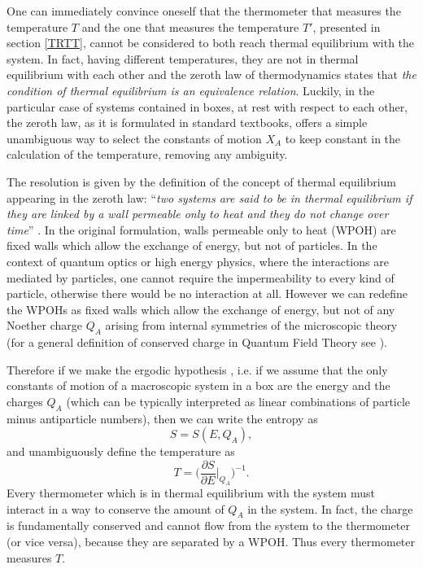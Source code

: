 \documentclass[twocolumn,usenatbib]{mnras2}
\begin{document}
%


One can immediately convince oneself that the thermometer that measures the temperature $T$ and the one that measures the temperature $T'$, presented in section \ref{TRTT}, cannot be considered to both reach thermal equilibrium with the system. In fact, having different temperatures, they are not in thermal equilibrium with each other and the zeroth law of thermodynamics states that \textit{the condition of thermal equilibrium is an equivalence relation}. Luckily, in the particular case of systems contained in boxes, at rest with respect to each other, the zeroth law, as it is formulated in standard textbooks, offers a simple unambiguous way to select the constants of motion $X_A$ to keep constant in the calculation of the temperature, removing any ambiguity. 

The resolution is given by the definition of the concept of thermal equilibrium appearing in the zeroth law: ``\textit{two systems are said to be in thermal equilibrium if they are linked by a wall permeable only to heat and they do not change over time}'' \citep{Caratheodory1909}. In the original formulation, walls permeable only to heat (WPOH) are fixed walls which allow the exchange of energy, but not of particles. In the context of quantum optics or high energy physics, where the interactions are mediated by particles, one cannot require the impermeability to every kind of particle, otherwise there would be no interaction at all. However we can redefine the WPOHs as fixed walls which allow the exchange of energy, but not of any Noether charge $Q_A$ arising from internal symmetries of the microscopic theory (for a general definition of conserved charge in Quantum Field Theory see \citealt{Peskin_book}).

Therefore if we make the ergodic hypothesis \citep{khinchin_book,Parisi_book_1988}, i.e. if we assume that the only constants of motion of a macroscopic system in a box are the energy and the charges $Q_A$ (which can be typically interpreted as linear combinations of particle minus antiparticle numbers), then we can write the entropy as
\begin{equation}\label{hththth}
S=S(E,Q_A),
\end{equation}
and unambiguously define the temperature as
\begin{equation}
T = \bigg( \dfrac{\partial S}{\partial E}\bigg|_{Q_A} \bigg)^{-1}.
\end{equation}
Every thermometer which is in thermal equilibrium with the system must interact in a way to conserve the amount of $Q_A$ in the system. In fact, the charge is fundamentally conserved and cannot flow from the system to the thermometer (or vice versa), because they are separated by a WPOH. Thus every thermometer measures $T$. 
\end{document}
